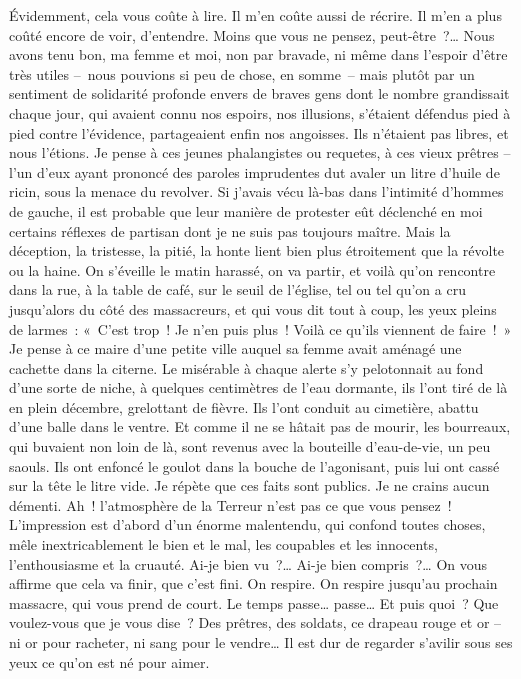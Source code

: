 \documentclass[french,twoside]{book} %
\begin{document}
Évidemment, cela vous coûte à lire. Il m’en coûte aussi de récrire. Il m’en a plus coûté encore de voir, d’entendre. Moins que vous ne pensez, peut-être ?… Nous avons tenu bon, ma femme et moi, non par bravade, ni même dans l’espoir d’être très utiles – nous pouvions si peu de chose, en somme – mais plutôt par un sentiment de solidarité profonde envers de braves gens dont le nombre grandissait chaque jour, qui avaient connu nos espoirs, nos illusions, s’étaient défendus pied à pied contre l’évidence, partageaient enfin nos angoisses. Ils n’étaient pas libres, et nous l’étions. Je pense à ces jeunes phalangistes ou requetes, à ces vieux prêtres – l’un d’eux ayant prononcé des paroles imprudentes dut avaler un litre d’huile de ricin, sous la menace du revolver. Si j’avais vécu là-bas dans l’intimité d’hommes de gauche, il est probable que leur manière de protester eût déclenché en moi certains réflexes de partisan dont je ne suis pas toujours maître. Mais la déception, la tristesse, la pitié, la honte lient bien plus étroitement que la révolte ou la haine. On s’éveille le matin harassé, on va partir, et voilà qu’on rencontre dans la rue, à la table de café, sur le seuil de l’église, tel ou tel qu’on a cru jusqu’alors du côté des massacreurs, et qui vous dit tout à coup, les yeux pleins de larmes : « C’est trop ! Je n’en puis plus ! Voilà ce qu’ils viennent de faire ! » Je pense à ce maire d’une petite ville auquel sa femme avait aménagé une cachette dans la citerne. Le misérable à chaque alerte s’y pelotonnait au fond d’une sorte de niche, à quelques centimètres de l’eau dormante, ils l’ont tiré de là en plein décembre, grelottant de fièvre. Ils l’ont conduit au cimetière, abattu d’une balle dans le ventre. Et comme il ne se hâtait pas de mourir, les bourreaux, qui buvaient non loin de là, sont revenus avec la bouteille d’eau-de-vie, un peu saouls. Ils ont enfoncé le goulot dans la bouche de l’agonisant, puis lui ont cassé sur la tête le litre vide. Je répète que ces faits sont publics. Je ne crains aucun démenti. Ah ! l’atmosphère de la Terreur n’est pas ce que vous pensez ! L’impression est d’abord d’un énorme malentendu, qui confond toutes choses, mêle inextricablement le bien et le mal, les coupables et les innocents, l’enthousiasme et la cruauté. Ai-je bien vu ?… Ai-je bien compris ?… On vous affirme que cela va finir, que c’est fini. On respire. On respire jusqu’au prochain massacre, qui vous prend de court. Le temps passe… passe… Et puis quoi ? Que voulez-vous que je vous dise ? Des prêtres, des soldats, ce drapeau rouge et or – ni or pour racheter, ni sang pour le vendre… Il est dur de regarder s’avilir sous ses yeux ce qu’on est né pour aimer.\par
\end{document}
